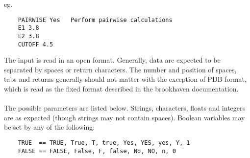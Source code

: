     eg.\\

    \begin{scriptsize}\begin{verbatim}
    PAIRWISE Yes   Perform pairwise calculations
    E1 3.8
    E2 3.8
    CUTOFF 4.5
    \end{verbatim} \end{scriptsize}

    The input is read in an open 
    format.  Generally, data are expected to be separated by spaces or 
    return characters.  The number and position of spaces, tabs and 
    returns generally should not matter with the exception of PDB
    format, which is read as the fixed format described in the
    brookhaven documentation.\\
    \\
    The possible parameters are listed below.  Strings, characters,
    floats and integers are as expected (though strings may not contain
    spaces). Boolean variables may be set by any of the following:

    \begin{scriptsize}\begin{verbatim}
    TRUE  == TRUE, True, T, true, Yes, YES, yes, Y, 1
    FALSE == FALSE, False, F, false, No, NO, n, 0
    \end{verbatim} \end{scriptsize}

